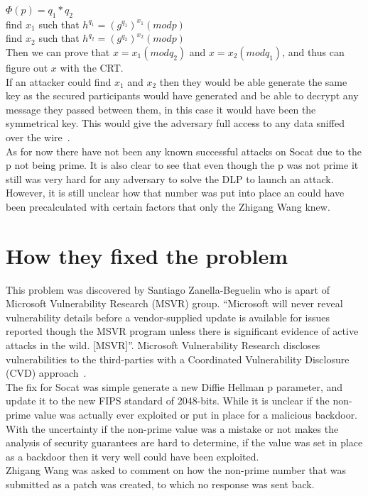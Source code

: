 \documentclass[letterpaper,11pt,notitlepage,fleqn]{article}
\begin{document}
\indent $\Phi(p)=q_{1}*q_{2}$\\
\indent find $x_{1}$ such that $h^{q_{1}}=(g^{q_{1}})^{x_1}(mod p)$ \\
\indent find $x_{2}$ such that $h^{q_{2}}=(g^{q_{2}})^{x_2}(mod p)$ \\
\indent Then we can prove that $x=x_{1}(mod q_{2})$ and $x=x_{2}(mod q_{1})$, and thus can figure out $x$ with the CRT. \\
If an attacker could find $x_{1}$ and $x_{2}$ then they would be able generate the same key as the secured participants would have generated and be able to decrypt any message they passed between them, in this case it would have been the symmetrical key. This would give the adversary full access to any data sniffed over the wire~\cite{thai}.
\\
\indent As for now there have not been any known successful attacks on Socat due to the p not being prime. It is also clear to see that even though the p was not prime it still was very hard for any adversary to solve the DLP to launch an attack. However, it is still unclear how that number was put into place an could have been precalculated with certain factors that only the Zhigang Wang knew.
\section{How they fixed the problem}
This problem was discovered by Santiago Zanella-Beguelin who is apart of Microsoft Vulnerability Research (MSVR) group. “Microsoft will never reveal vulnerability details before a vendor-supplied update is available for issues reported though the MSVR program unless there is significant evidence of active attacks in the wild. [MSVR]”. Microsoft Vulnerability Research discloses vulnerabilities to the third-parties with a Coordinated Vulnerability Disclosure (CVD)
approach~\cite{Microsoft}.
\\
The fix for Socat was simple generate a new Diffie Hellman p parameter, and update it to the new FIPS standard of 2048-bits. While it is unclear if the non-prime value was actually ever exploited or put in place for a malicious backdoor. With the uncertainty if the non-prime value was a mistake or not makes the analysis of security guarantees are hard to determine, if the value was set in place as a backdoor then it very well could have been exploited.
\\
Zhigang Wang was asked to comment on how the non-prime number that was submitted as a patch was created, to which no response was sent back. 
\end{document}
